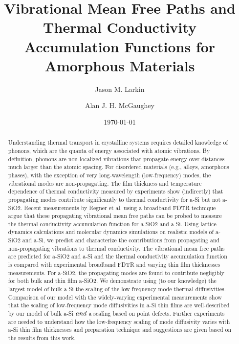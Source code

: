 \documentclass[aps,prb,twocolumn,superscriptaddress,footinbib,amsmath,amssymb,floatfix]{revtex4}
\begin{document}
\title{Vibrational Mean Free Paths and Thermal Conductivity 
Accumulation Functions for Amorphous Materials}
\author{Jason M. Larkin}
\author{Alan J. H. McGaughey}
\date{\today}
\begin{abstract}

Understanding thermal transport in crystalline systems requires detailed 
knowledge of phonons, which are the quanta of energy associated with 
atomic 
vibrations. By definition, phonons are non-localized vibrations that 
propagate energy over distances much larger than the atomic spacing. For 
disordered materials (e.g., alloys, amorphous phases), with the 
exception 
of very long-wavelength (low-frequency) modes, the vibrational modes are 
non-propagating. The film thickness and temperature dependence 
of thermal conductivity measured by experiments show 
(indirectly) that propagating modes contribute 
significantly to thermal conductivity for a-Si but not a-SiO2. 
Recent measurements by Regner et al. using a 
broadband FDTR technique argue that these propagating vibrational 
mean free paths can 
be probed to measure the 
thermal conductivity accumulation function for a-SiO2 and a-Si.   
Using lattice dynamics calculations and molecular dynamics simulations 
on 
realistic models of a-SiO2 and a-Si, we predict and 
characterize the contributions from propagating and non-propagating 
vibrations 
to thermal conductivity. The vibrational mean free paths are 
predicted for a-SiO2 and a-Si and the thermal 
conductivity accumulation function is compared with experimental 
broadband FDTR and varying thin film thicknesses measurements. 
For a-SiO2, the propagating modes are found to contribute 
negligibly for both bulk and thin film a-SiO2. We demonstrate using 
(to our knowledge) the largest model of bulk a-Si the scaling 
of the low frequency mode thermal diffusivities.  
Comparison of our model with 
the widely-varying experimental measurements  
show that the scaling of low-frequency mode diffusivities in a-Si 
thin films are well-described by our model 
of bulk a-Si $\emph{and}$ a scaling based on point defects. Further  
experiments are needed to understand how the low-frequency scaling 
of mode diffusivity varies with a-Si thin film thicknesses 
and preparation technique and suggestions are given based on 
the results from this work. 

\end{abstract}
\maketitle
\clearpage
\end{document}
